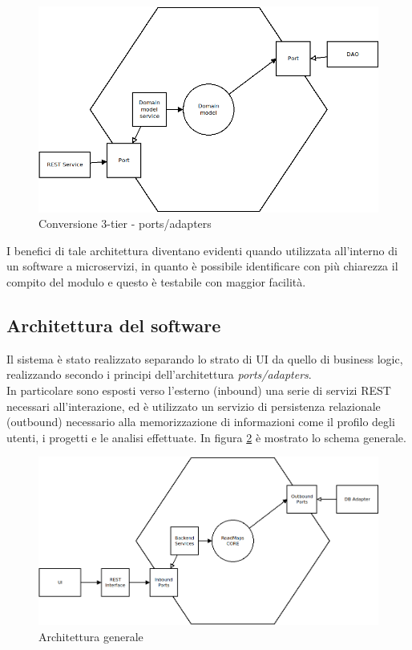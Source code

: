 \begin{figure}[h]
	\centering
	\includegraphics[scale=0.5]{img/hexagonal_3_tier}
	\caption{Conversione 3-tier - ports/adapters}
	\label{fig:hexagonal_3_tier}
\end{figure}

I benefici di tale architettura diventano evidenti quando utilizzata all'interno di un software a microservizi, in quanto è possibile identificare con più chiarezza il compito del modulo e questo è testabile con maggior facilità.

\subsection{Architettura del software}
Il sistema è stato realizzato separando lo strato di UI da quello di business logic, realizzando secondo i principi dell'architettura \textit{ports/adapters}.\\
In particolare sono esposti verso l'esterno (inbound) una serie di servizi REST necessari all'interazione, ed è utilizzato un servizio di persistenza relazionale (outbound) necessario alla memorizzazione di informazioni come il profilo degli utenti, i progetti e le analisi effettuate.
In figura \ref{fig:architecture00} è mostrato lo schema generale.

\begin{figure}[h]
	\centering
	\includegraphics[width=\textwidth]{img/architecture00}
	\caption{Architettura generale}
	\label{fig:architecture00}
\end{figure}

